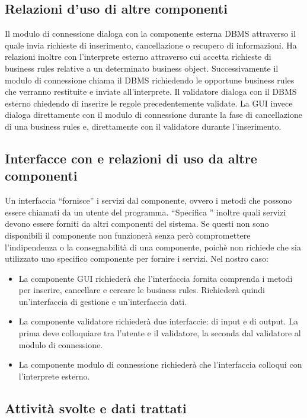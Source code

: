 \documentclass[11pt,titlepage,a4paper]{report}
\begin{document}
\subsection{Relazioni d'uso di altre componenti}
Il modulo di connessione dialoga con la componente esterna DBMS attraverso il quale invia richieste di inserimento, cancellazione o recupero di informazioni. Ha relazioni inoltre con l'interprete esterno attraverso cui accetta richieste di business rules relative a un determinato business object. Successivamente il modulo di connessione chiama il DBMS richiedendo le opportune business rules che verranno restituite e inviate all'interprete. Il validatore dialoga con il DBMS esterno chiedendo di inserire le regole precedentemente validate. La GUI invece dialoga direttamente con il modulo di connessione durante la fase di cancellazione di una business rules e, direttamente con il validatore durante l'inserimento.

\subsection{Interfacce con e relazioni di uso da altre componenti}
Un interfaccia ``fornisce'' i servizi dal componente, ovvero i metodi che possono essere chiamati da un utente del programma. ``Specifica '' inoltre quali servizi devono essere forniti da altri componenti del sistema. Se questi non sono disponibili il componente non funzioner\`a senza per\`o compromettere l'indipendenza o la consegnabilit\`a di una componente, poich\`e non richiede che sia utilizzato uno specifico componente per fornire i servizi. Nel nostro caso:
\begin{itemize}
\item La componente GUI richieder\`a che l'interfaccia fornita comprenda i metodi per inserire, cancellare e cercare le business rules. Richieder\`a quindi un'interfaccia di gestione e un'interfaccia dati.
\item La componente validatore richieder\`a due interfaccie: di input e di output. La prima deve colloquiare tra l'utente e il validatore, la seconda dal validatore al modulo di connessione.
\item La componente modulo di connessione richieder\`a che l'interfaccia colloqui con l'interprete esterno.
\end{itemize}
\subsection{Attivit\`a svolte e dati trattati}
\end{document}
